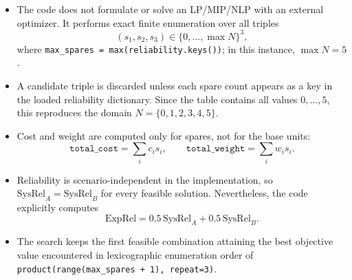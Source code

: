 \begin{itemize}
    \item The code does not formulate or solve an LP/MIP/NLP with an external optimizer. It performs exact finite enumeration over all triples
    \[
    (s_1,s_2,s_3)\in \{0,\dots,\max N\}^3,
    \]
    where \texttt{max\_spares = max(reliability.keys())}; in this instance, \(\max N=5\).
    \item A candidate triple is discarded unless each spare count appears as a key in the loaded reliability dictionary. Since the table contains all values \(0,\dots,5\), this reproduces the domain \(N=\{0,1,2,3,4,5\}\).
    \item Cost and weight are computed only for spares, not for the base units:
    \[
    \texttt{total\_cost}=\sum_i c_i s_i,\qquad
    \texttt{total\_weight}=\sum_i w_i s_i.
    \]
    \item Reliability is scenario-independent in the implementation, so \(\mathrm{SysRel}_A=\mathrm{SysRel}_B\) for every feasible solution. Nevertheless, the code explicitly computes
    \[
    \mathrm{ExpRel}=0.5\,\mathrm{SysRel}_A+0.5\,\mathrm{SysRel}_B.
    \]
    \item The search keeps the first feasible combination attaining the best objective value encountered in lexicographic enumeration order of \texttt{product(range(max\_spares + 1), repeat=3)}.
\end{itemize}
